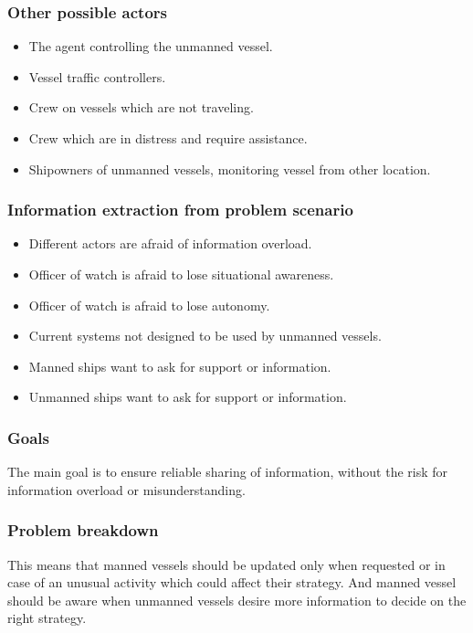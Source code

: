 \subsubsection{Other possible actors}
\begin{itemize}
	\item The agent controlling the unmanned vessel. 
	\item Vessel traffic controllers.
	\item Crew on vessels which are not traveling.
	\item Crew which are in distress and require assistance.
	\item Shipowners of unmanned vessels, monitoring vessel from other location.
\end{itemize}

\subsubsection{Information extraction from problem scenario}
\begin{itemize}
	\item Different actors are afraid of information overload.
	\item Officer of watch is afraid to lose situational awareness.
	\item Officer of watch is afraid to lose autonomy.
	\item Current systems not designed to be used by unmanned vessels.
	\item Manned ships want to ask for support or information.
	\item Unmanned ships want to ask for support or information.
\end{itemize}

\subsubsection{Goals}
The main goal is to ensure reliable sharing of information, without the risk for information overload or misunderstanding. 

\subsubsection{Problem breakdown}
This means that manned vessels should be updated only when requested or in case of an unusual activity which could affect their strategy. And manned vessel should be aware when unmanned vessels desire more information to decide on the right strategy.

